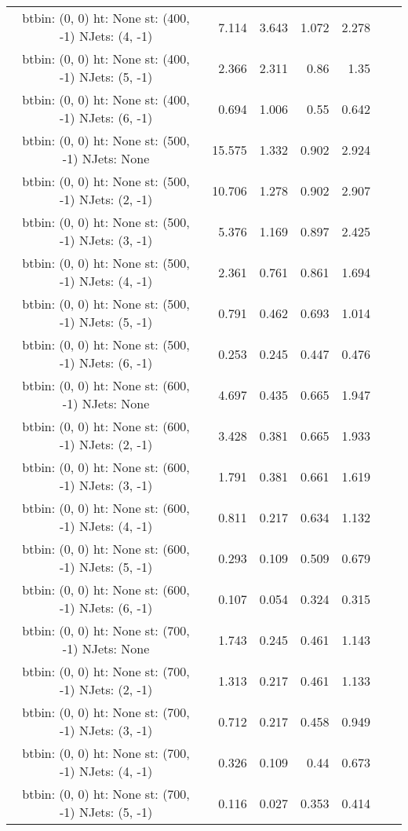 \documentclass[12pt]{paper}
\begin{document}
\begin{landscape}
\begin{longtable}{c|r|r|r|r|r|r}
btbin:  (0, 0) ht:  None st:  (400, -1) NJets:  (4, -1)
 & 7.114 & 3.643 & 1.072 & 2.278\\
btbin:  (0, 0) ht:  None st:  (400, -1) NJets:  (5, -1)
 & 2.366 & 2.311 & 0.86 & 1.35\\
btbin:  (0, 0) ht:  None st:  (400, -1) NJets:  (6, -1)
 & 0.694 & 1.006 & 0.55 & 0.642\\
btbin:  (0, 0) ht:  None st:  (500, -1) NJets:  None
 & 15.575 & 1.332 & 0.902 & 2.924\\
btbin:  (0, 0) ht:  None st:  (500, -1) NJets:  (2, -1)
 & 10.706 & 1.278 & 0.902 & 2.907\\
btbin:  (0, 0) ht:  None st:  (500, -1) NJets:  (3, -1)
 & 5.376 & 1.169 & 0.897 & 2.425\\
btbin:  (0, 0) ht:  None st:  (500, -1) NJets:  (4, -1)
 & 2.361 & 0.761 & 0.861 & 1.694\\
btbin:  (0, 0) ht:  None st:  (500, -1) NJets:  (5, -1)
 & 0.791 & 0.462 & 0.693 & 1.014\\
btbin:  (0, 0) ht:  None st:  (500, -1) NJets:  (6, -1)
 & 0.253 & 0.245 & 0.447 & 0.476\\
btbin:  (0, 0) ht:  None st:  (600, -1) NJets:  None
 & 4.697 & 0.435 & 0.665 & 1.947\\
btbin:  (0, 0) ht:  None st:  (600, -1) NJets:  (2, -1)
 & 3.428 & 0.381 & 0.665 & 1.933\\
btbin:  (0, 0) ht:  None st:  (600, -1) NJets:  (3, -1)
 & 1.791 & 0.381 & 0.661 & 1.619\\
btbin:  (0, 0) ht:  None st:  (600, -1) NJets:  (4, -1)
 & 0.811 & 0.217 & 0.634 & 1.132\\
btbin:  (0, 0) ht:  None st:  (600, -1) NJets:  (5, -1)
 & 0.293 & 0.109 & 0.509 & 0.679\\
btbin:  (0, 0) ht:  None st:  (600, -1) NJets:  (6, -1)
 & 0.107 & 0.054 & 0.324 & 0.315\\
btbin:  (0, 0) ht:  None st:  (700, -1) NJets:  None
 & 1.743 & 0.245 & 0.461 & 1.143\\
btbin:  (0, 0) ht:  None st:  (700, -1) NJets:  (2, -1)
 & 1.313 & 0.217 & 0.461 & 1.133\\
btbin:  (0, 0) ht:  None st:  (700, -1) NJets:  (3, -1)
 & 0.712 & 0.217 & 0.458 & 0.949\\
btbin:  (0, 0) ht:  None st:  (700, -1) NJets:  (4, -1)
 & 0.326 & 0.109 & 0.44 & 0.673\\
btbin:  (0, 0) ht:  None st:  (700, -1) NJets:  (5, -1)
 & 0.116 & 0.027 & 0.353 & 0.414\\

\end{longtable}
\end{landscape}
\end{document}
